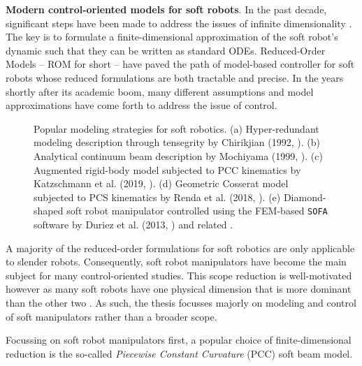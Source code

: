 \textbf{Modern control-oriented models for soft robots}. In the past decade, significant steps have been made to address the issues of infinite dimensionality \cite{DellaSantina2021}. The key is to formulate a finite-dimensional approximation of the soft robot's dynamic such that they can be written as standard ODEs. Reduced-Order Models -- ROM for short -- have paved the path of model-based controller for soft robots whose reduced formulations are both tractable and precise. In the years shortly after its academic boom, many different assumptions and model approximations have come forth to address the issue of control. 
%
\begin{figure}[!t]
  \vspace{-3mm}
  \ifx\printFigures\undefined
  \else
  \hspace{-8mm}
  \vspace{-6mm}
  \fi
  \caption{Popular modeling strategies for soft robotics. (a) Hyper-redundant modeling description through tensegrity by Chirikjian (1992, \cite{Chirikjian1992,Chirikjian1994}). (b) Analytical continuum beam description by Mochiyama (1999, \cite{Mochiyama1999,Mochiyama2003}). (c) Augmented rigid-body model subjected to PCC kinematics by Katzschmann et al. (2019, \cite{Katzschmann2019}). (d) Geometric Cosserat model subjected to PCS kinematics by Renda et al. (2018, \cite{Renda2018}). (e) Diamond-shaped soft robot manipulator controlled using the FEM-based \texttt{SOFA} software by Duriez et al. (2013, \cite{Duriez2013}) and related \cite{Coevoet2017,Goury2018}.}
  \label{fig:C0:modeltypes}
  \vspace{-5mm}
\end{figure}
%
\begin{rmk}
A majority of the reduced-order formulations for soft robotics are only applicable to slender robots. Consequently, soft robot manipulators have become the main subject for many control-oriented studies. This scope reduction is well-motivated however as many soft robots have one physical dimension that is more dominant than the other two \cite{DellaSantina2021}. As such, the thesis focusses majorly on modeling and control of soft manipulators rather than a broader scope.
\end{rmk}
%
\par 
Focussing on soft robot manipulators first, a popular choice of finite-dimensional reduction is the so-called \textit{Piecewise Constant Curvature} (PCC) soft beam model. 
